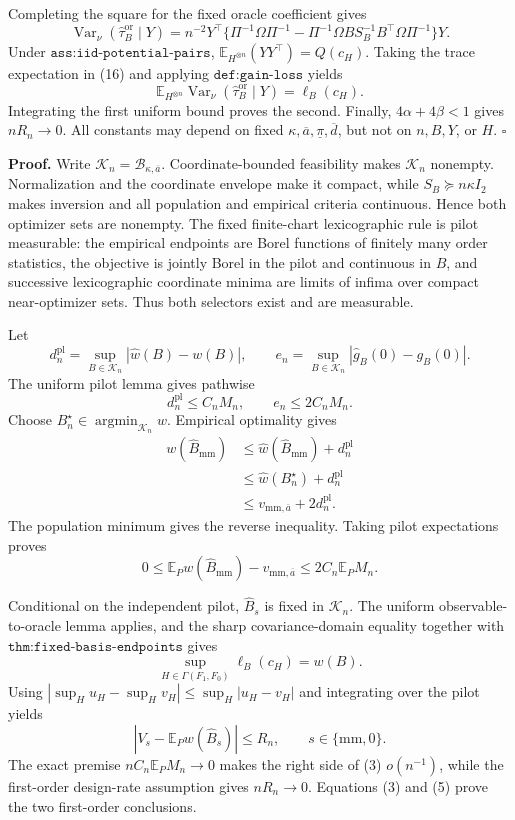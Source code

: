 Completing the square for the fixed oracle coefficient gives
\[
\operatorname{Var}_\nu(\widehat\tau_B^{\mathrm{or}}\mid Y)
=n^{-2}Y^{\top}\{\Pi^{-1}\Omega\Pi^{-1}
-\Pi^{-1}\Omega BS_B^{-1}B^{\top}\Omega\Pi^{-1}\}Y.
\tag{16}
\]
Under \(\texttt{ass:iid-potential-pairs}\), \(\mathbb E_{H^{\otimes n}}(YY^{\top})=Q(c_H)\).  Taking the trace expectation in (16) and applying \(\texttt{def:gain-loss}\) yields
\[
\mathbb E_{H^{\otimes n}}\operatorname{Var}_\nu(\widehat\tau_B^{\mathrm{or}}\mid Y)
=\ell_B(c_H).
\tag{17}
\]
Integrating the first uniform bound proves the second.  Finally, \(4\alpha+4\beta<1\) gives \(nR_n\to0\).  All constants may depend on fixed \(\kappa,\overline a,\underline\pi,\overline d\), but not on \(n,B,Y\), or \(H\). \(\square\)

\textbf{Proof.}
Write \(\mathcal K_n=\mathcal B_{\kappa,\overline a}\).  Coordinate-bounded feasibility makes \(\mathcal K_n\) nonempty.  Normalization and the coordinate envelope make it compact, while \(S_B\succeq n\kappa I_2\) makes inversion and all population and empirical criteria continuous.  Hence both optimizer sets are nonempty.  The fixed finite-chart lexicographic rule is pilot measurable: the empirical endpoints are Borel functions of finitely many order statistics, the objective is jointly Borel in the pilot and continuous in \(B\), and successive lexicographic coordinate minima are limits of infima over compact near-optimizer sets.  Thus both selectors exist and are measurable.

Let
\[
d_n^{\mathrm{pl}}=\sup_{B\in\mathcal K_n}|\widehat w(B)-w(B)|,
\qquad
e_n=\sup_{B\in\mathcal K_n}|\widehat g_B(0)-g_B(0)|.
\]
The uniform pilot lemma gives pathwise
\[
d_n^{\mathrm{pl}}\le C_nM_n,
\qquad e_n\le2C_nM_n.
\tag{1}
\]
Choose \(B_n^\star\in\operatorname*{argmin}_{\mathcal K_n}w\).  Empirical optimality gives
\[
\begin{aligned}
w(\widehat B_{\mathrm{mm}})
&\le\widehat w(\widehat B_{\mathrm{mm}})+d_n^{\mathrm{pl}}\\
&\le\widehat w(B_n^\star)+d_n^{\mathrm{pl}}\\
&\le v_{\mathrm{mm},\overline a}+2d_n^{\mathrm{pl}}.
\end{aligned}
\tag{2}
\]
The population minimum gives the reverse inequality.  Taking pilot expectations proves
\[
0\le\mathbb E_Pw(\widehat B_{\mathrm{mm}})-v_{\mathrm{mm},\overline a}
\le2C_n\mathbb E_PM_n.
\tag{3}
\]

Conditional on the independent pilot, \(\widehat B_s\) is fixed in \(\mathcal K_n\).  The uniform observable-to-oracle lemma applies, and the sharp covariance-domain equality together with \(\texttt{thm:fixed-basis-endpoints}\) gives
\[
\sup_{H\in\Gamma(F_1,F_0)}\ell_B(c_H)=w(B).
\tag{4}
\]
Using \(|\sup_Hu_H-\sup_Hv_H|\le\sup_H|u_H-v_H|\) and integrating over the pilot yields
\[
|V_s-\mathbb E_Pw(\widehat B_s)|\le R_n,
\qquad s\in\{\mathrm{mm},0\}.
\tag{5}
\]
The exact premise \(nC_n\mathbb E_PM_n\to0\) makes the right side of (3) \(o(n^{-1})\), while the first-order design-rate assumption gives \(nR_n\to0\).  Equations (3) and (5) prove the two first-order conclusions.

